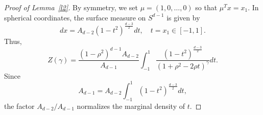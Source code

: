 \documentclass{article}
\begin{document}
\begin{proof}[Proof of Lemma~\ref{l2}]
By symmetry, we set $\mu = (1, 0, \dots, 0)$ so that $\mu^T x = x_1$. In spherical coordinates, the surface measure on $S^{d-1}$ is given by
\begin{equation*}
    dx = A_{d-2} (1 - t^2)^{\frac{d-3}{2}} dt, \quad t = x_1 \in [-1,1].
\end{equation*}
Thus,
\begin{equation*}
    Z(\gamma) = \frac{(1 - \rho^2)^{d-1} A_{d-2}}{A_{d-1}} \int_{-1}^{1} \frac{(1 - t^2)^{\frac{d-3}{2}}}{(1 + \rho^2 - 2\rho t)^{\gamma}} dt.
\end{equation*}
Since
\begin{equation*}
    A_{d-1} = A_{d-2} \int_{-1}^{1} (1 - t^2)^{\frac{d-3}{2}} dt,
\end{equation*}
the factor $A_{d-2}/A_{d-1}$ normalizes the marginal density of $t$.


\end{proof}
\end{document}
